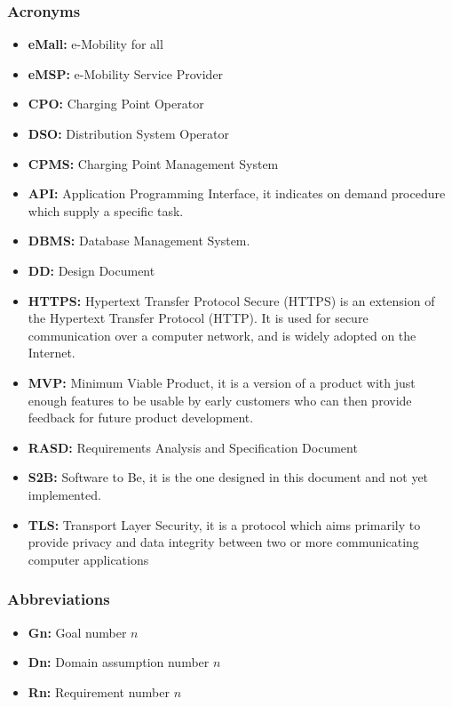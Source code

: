 \subsubsection{Acronyms}
\begin{itemize}
    \item \textbf{eMall:} e-Mobility for all
    \item \textbf{eMSP:} e-Mobility Service Provider
    \item \textbf{CPO:} Charging Point Operator
    \item \textbf{DSO:} Distribution System Operator
    \item \textbf{CPMS:} Charging Point Management System
    \item \textbf{API:} Application Programming Interface, it indicates on demand procedure which supply a specific task.
    \item \textbf{DBMS:} Database Management System.
    \item \textbf{DD:} Design Document    
    \item \textbf{HTTPS:} Hypertext Transfer Protocol Secure (HTTPS) is an extension of the Hypertext Transfer Protocol (HTTP). It is used for secure communication over a computer network, and is widely adopted on the Internet.
    \item \textbf{MVP:} Minimum Viable Product, it is a version of a product with just enough features to be usable by early customers who can then provide feedback for future product development.
    \item \textbf{RASD:} Requirements Analysis and Specification Document
    \item \textbf{S2B:} Software to Be, it is the one designed in this document and not yet implemented.
    \item \textbf{TLS:} Transport Layer Security, it is a protocol which aims primarily to provide privacy and data integrity between two or more communicating computer applications
\end{itemize}
\subsubsection{Abbreviations}
\begin{itemize}
    \item \textbf{Gn:} Goal number $n$
    \item \textbf{Dn:} Domain assumption number $n$
    \item \textbf{Rn:} Requirement number $n$
\end{itemize}
